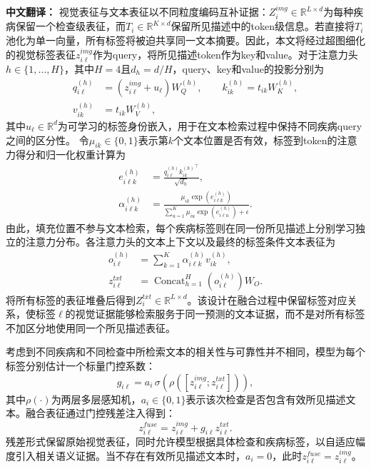 \documentclass[Afour,sagev,times]{sagej}
\begin{document}
\textbf{中文翻译：} 视觉表征与文本表征以不同粒度编码互补证据：$Z_i^{img}\in\mathbb{R}^{L\times d}$为每种疾病保留一个检查级表征，而$T_i\in\mathbb{R}^{K\times d}$保留所见描述中的token级信息。若直接将$T_i$池化为单一向量，所有标签将被迫共享同一文本摘要。因此，本文将经过超图细化的视觉标签表征$z_{i\ell}^{img}$作为query，将所见描述token作为key和value。对于注意力头$h\in\{1,\ldots,H\}$，其中$H=4$且$d_h=d/H$，query、key和value的投影分别为
\begin{equation}
\begin{aligned}
q_{i\ell}^{(h)}&=(z_{i\ell}^{img}+u_{\ell})W_Q^{(h)},\qquad
k_{ik}^{(h)}=t_{ik}W_K^{(h)},\\
v_{ik}^{(h)}&=t_{ik}W_V^{(h)},
\end{aligned}
\end{equation}
其中$u_{\ell}\in\mathbb{R}^{d}$为可学习的标签身份嵌入，用于在文本检索过程中保持不同疾病query之间的区分性。
令$\mu_{ik}\in\{0,1\}$表示第$k$个文本位置是否有效，标签到token的注意力得分和归一化权重计算为
\begin{equation}
\begin{aligned}
e_{i\ell k}^{(h)}&=\frac{q_{i\ell}^{(h)}{k_{ik}^{(h)}}^{\top}}{\sqrt{d_h}},\\
\alpha_{i\ell k}^{(h)}&=
\frac{\mu_{ik}\exp(e_{i\ell k}^{(h)})}
{\sum_{u=1}^{K}\mu_{iu}\exp(e_{i\ell u}^{(h)})+\epsilon}.
\end{aligned}
\end{equation}
由此，填充位置不参与文本检索，每个疾病标签则在同一份所见描述上分别学习独立的注意力分布。各注意力头的文本上下文以及最终的标签条件文本表征为
\begin{equation}
\begin{aligned}
o_{i\ell}^{(h)}&=\sum_{k=1}^{K}\alpha_{i\ell k}^{(h)}v_{ik}^{(h)},\\
z_{i\ell}^{txt}&=\operatorname{Concat}_{h=1}^{H}\!\left(o_{i\ell}^{(h)}\right)W_O.
\end{aligned}
\end{equation}
将所有标签的表征堆叠后得到$Z_i^{txt}\in\mathbb{R}^{L\times d}$。该设计在融合过程中保留标签对应关系，使标签$\ell$的视觉证据能够检索服务于同一预测的文本证据，而不是对所有标签不加区分地使用同一个所见描述表征。

考虑到不同疾病和不同检查中所检索文本的相关性与可靠性并不相同，模型为每个标签分别估计一个标量门控系数：
\begin{equation}
g_{i\ell}=a_i\,\sigma\!\left(\rho([z_{i\ell}^{img};z_{i\ell}^{txt}])\right),
\end{equation}
其中$\rho(\cdot)$为两层多层感知机，$a_i\in\{0,1\}$表示该次检查是否包含有效所见描述文本。融合表征通过门控残差注入得到：
\begin{equation}
z_{i\ell}^{fuse}=z_{i\ell}^{img}+g_{i\ell}z_{i\ell}^{txt}.
\end{equation}
残差形式保留原始视觉表征，同时允许模型根据具体检查和疾病标签，以自适应幅度引入相关语义证据。当不存在有效所见描述文本时，$a_i=0$，此时$z_{i\ell}^{fuse}=z_{i\ell}^{img}$。
\end{document}
